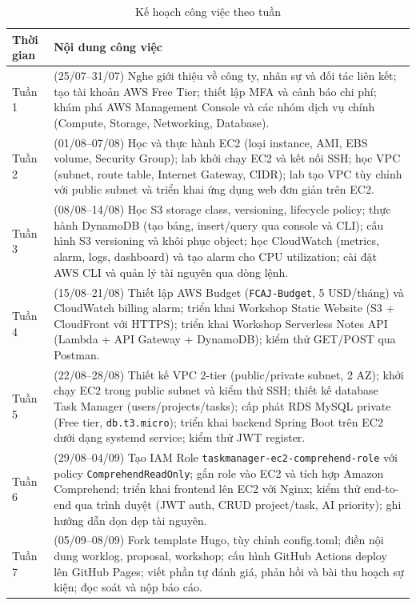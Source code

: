 \documentclass[13pt]{extarticle}
\begin{document}
\begin{longtable}{p{1.8cm}p{12cm}}
\caption{Kế hoạch công việc theo tuần}
\label{tab:plan} \\
\toprule
\textbf{Thời gian} & \textbf{Nội dung công việc} \\
\midrule
\endhead
Tuần 1 & (25/07--31/07) Nghe giới thiệu về công ty, nhân sự và đối tác liên kết;
tạo tài khoản AWS Free Tier; thiết lập MFA và cảnh báo chi phí; khám phá AWS
Management Console và các nhóm dịch vụ chính (Compute, Storage, Networking, Database). \\
Tuần 2 & (01/08--07/08) Học và thực hành EC2 (loại instance, AMI, EBS volume, Security
Group); lab khởi chạy EC2 và kết nối SSH; học VPC (subnet, route table, Internet
Gateway, CIDR); lab tạo VPC tùy chỉnh với public subnet và triển khai ứng dụng
web đơn giản trên EC2. \\
Tuần 3 & (08/08--14/08) Học S3 storage class, versioning, lifecycle policy; thực hành
DynamoDB (tạo bảng, insert/query qua console và CLI); cấu hình S3 versioning và khôi phục
object; học CloudWatch (metrics, alarm, logs, dashboard) và tạo alarm cho CPU
utilization; cài đặt AWS CLI và quản lý tài nguyên qua dòng lệnh. \\
Tuần 4 & (15/08--21/08) Thiết lập AWS Budget (\texttt{FCAJ-Budget}, 5 USD/tháng) và
CloudWatch billing alarm; triển khai Workshop Static Website (S3 + CloudFront
với HTTPS); triển khai Workshop Serverless Notes API (Lambda + API Gateway +
DynamoDB); kiểm thử GET/POST qua Postman. \\
Tuần 5 & (22/08--28/08) Thiết kế VPC 2-tier (public/private subnet, 2 AZ); khởi
chạy EC2 trong public subnet và kiểm thử SSH; thiết kế database Task Manager
(users/projects/tasks); cấp phát RDS MySQL private (Free tier, \texttt{db.t3.micro});
triển khai backend Spring Boot trên EC2 dưới dạng systemd service; kiểm thử
JWT register. \\
Tuần 6 & (29/08--04/09) Tạo IAM Role \texttt{taskmanager-ec2-comprehend-role} với
policy \texttt{ComprehendReadOnly}; gắn role vào EC2 và tích hợp Amazon Comprehend;
triển khai frontend lên EC2 với Nginx; kiểm thử end-to-end qua trình duyệt
(JWT auth, CRUD project/task, AI priority); ghi hướng dẫn dọn dẹp tài nguyên. \\
Tuần 7 & (05/09--08/09) Fork template Hugo, tùy chỉnh config.toml; điền nội dung
worklog, proposal, workshop; cấu hình GitHub Actions deploy lên GitHub Pages;
viết phần tự đánh giá, phản hồi và bài thu hoạch sự kiện; đọc soát và nộp báo cáo. \\
\bottomrule
\end{longtable}
\end{document}
